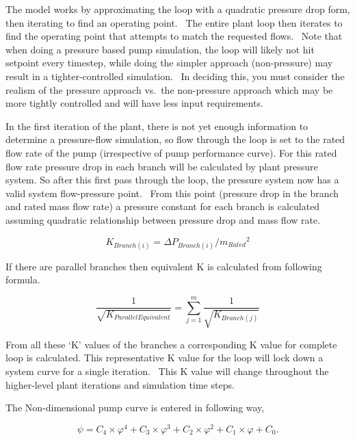 The model works by approximating the loop with a quadratic pressure drop form, then iterating to find an operating point.~ The entire plant loop then iterates to find the operating point that attempts to match the requested flows.~ Note that when doing a pressure based pump simulation, the loop will likely not hit setpoint every timestep, while doing the simpler approach (non-pressure) may result in a tighter-controlled simulation.~ In deciding this, you must consider the realism of the pressure approach vs.~the non-pressure approach which may be more tightly controlled and will have less input requirements.

In the first iteration of the plant, there is not yet enough information to determine a pressure-flow simulation, so flow through the loop is set to the rated flow rate of the pump (irrespective of pump performance curve). For this rated flow rate pressure drop in each branch will be calculated by plant pressure system. So after this first pass through the loop, the pressure system now has a valid system flow-pressure point.~ From this point (pressure drop in the branch and rated mass flow rate) a pressure constant for each branch is calculated assuming quadratic relationship between pressure drop and mass flow rate.

\begin{equation}
{K_{Branch(i)}} = \Delta {P_{Branch(i)}}/{m_{Rated}}^2
\end{equation}

If there are parallel branches then equivalent K is calculated from following formula.

\begin{equation}
\frac{1}{{\sqrt {{K_{ParallelEquivalent}}} }} = \sum\limits_{j = 1}^m {\frac{1}{{\sqrt {{K_{Branch(j)}}} }}}
\end{equation}

From all these `K' values of the branches a corresponding K value for complete loop is calculated. This representative K value for the loop will lock down a system curve for a single iteration.~ This K value will change throughout the higher-level plant iterations and simulation time steps.

The Non-dimensional pump curve is entered in following way,

\begin{equation}
\psi  = {C_4} \times {\varphi ^4} + {C_3} \times {\varphi ^3} + {C_2} \times {\varphi ^2} + {C_1} \times \varphi  + {C_0}.
\end{equation}

